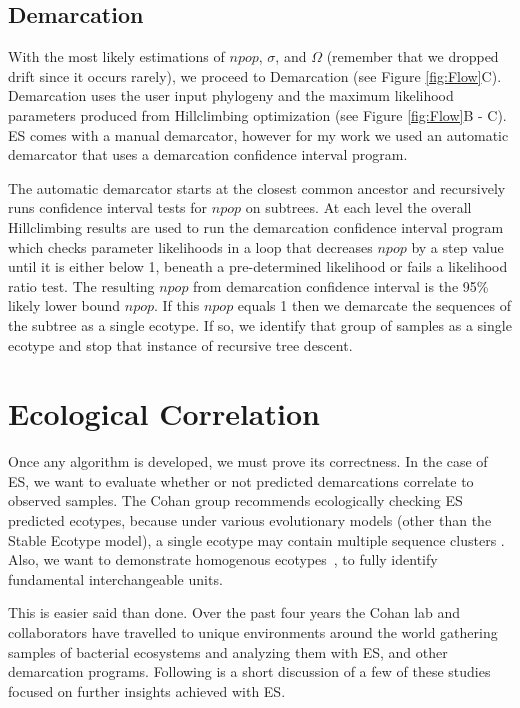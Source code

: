 \subsection*{Demarcation}
With the most likely estimations of $npop$, $\sigma$, and $\Omega$ (remember that we dropped drift since it occurs rarely), we proceed to Demarcation (see Figure \ref{fig:Flow}C).
Demarcation uses the user input phylogeny and the maximum likelihood parameters produced from Hillclimbing optimization (see Figure \ref{fig:Flow}B - C).
ES comes with a manual demarcator, however for my work we used an automatic demarcator that uses a demarcation confidence interval program.

The automatic demarcator starts at the closest common ancestor and recursively runs confidence interval tests for $npop$ on subtrees.
At each level the overall Hillclimbing results are used to run the demarcation confidence interval program which checks parameter likelihoods in a loop that decreases $npop$ by a step value until it is either below 1, beneath a pre-determined likelihood or fails a likelihood ratio test.
The resulting $npop$ from demarcation confidence interval is the 95\% likely lower bound $npop$.
If this $npop$ equals 1 then we demarcate the sequences of the subtree as a single ecotype.
If so, we identify that group of samples as a single ecotype and stop that instance of recursive tree descent.

\section{Ecological Correlation}
Once any algorithm is developed, we must prove its correctness.
In the case of ES, we want to evaluate whether or not predicted demarcations correlate to observed samples.
The Cohan group recommends ecologically checking ES predicted ecotypes, because under various evolutionary models (other than the Stable Ecotype model), a single ecotype may contain multiple sequence clusters \cite{koeppel2008identifying, connor2010ecology}.
Also, we want to demonstrate homogenous ecotypes~\cite{wiedenbeckHGT}, to fully identify fundamental interchangeable units.

This is easier said than done.
Over the past four years the Cohan lab and collaborators have travelled to unique environments around the world gathering samples of bacterial ecosystems and analyzing them with ES, and other demarcation programs.
Following is a short discussion of a few of these studies focused on further insights achieved with ES.


